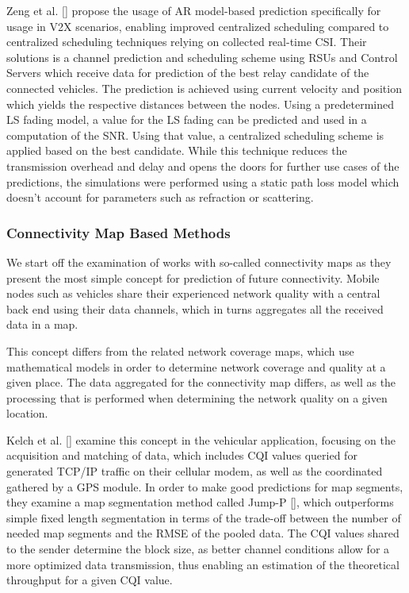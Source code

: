 \documentclass{IEEEtran}
\begin{document}
Zeng et al. [] propose the usage of AR model-based prediction specifically for usage in V2X scenarios, enabling improved centralized scheduling compared to centralized scheduling techniques relying on collected real-time CSI. 
Their solutions is a channel prediction and scheduling scheme using RSUs and Control Servers which receive data for prediction of the best relay candidate of the connected vehicles. The prediction is achieved using current velocity and position which yields the respective distances between the nodes. Using a predetermined LS fading model, a value for the LS fading can be predicted and used in a computation of the SNR. Using that value, a centralized scheduling scheme is applied based on the best candidate.
While this technique reduces the transmission overhead and delay and opens the doors for further use cases of the predictions, the simulations were performed using a static path loss model which doesn’t account for parameters such as refraction or scattering.

\subsubsection{Connectivity Map Based Methods}
We start off the examination of works with so-called connectivity maps as they present the most simple concept for prediction of future connectivity. Mobile nodes such as vehicles share their experienced network quality with a central back end using their data channels, which in turns aggregates all the received data in a map.

This concept differs from the related network coverage maps, which use mathematical models in order to determine network coverage and quality at a given place.
The data aggregated for the connectivity map differs, as well as the processing that is performed when determining the network quality on a given location.

Kelch et al. [] examine this concept in the vehicular application, focusing on the acquisition and matching of data, which includes CQI values queried for generated TCP/IP traffic on their cellular modem, as well as the coordinated gathered by a GPS module. In order to make good predictions for map segments, they examine a map segmentation method called Jump-P [], which outperforms simple fixed length segmentation in terms of the trade-off between the number of needed map segments and the RMSE of the pooled data. The CQI values shared to the sender determine the block size, as better channel conditions allow for a more optimized data transmission, thus enabling an estimation of the theoretical throughput for a given CQI value.
\end{document}
